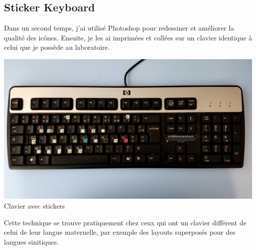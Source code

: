 \documentclass[12pt,a4paper]{article}
\begin{document}
\subsection{Sticker Keyboard}
Dans un second temps, j'ai utilisé Photoshop pour redessiner et améliorer la qualité des icônes. Ensuite, je les ai imprimées et collées sur un clavier identique à celui que je possède au laboratoire.
\begin{center}
	\includegraphics[width=1\linewidth]{20180723_124229.jpg}
	Clavier avec stickers
\end{center}

Cette technique se trouve pratiquement chez ceux qui ont un clavier différent de celui de leur langue maternelle, par exemple des layouts superposés pour des langues sinitiques.
\end{document}
